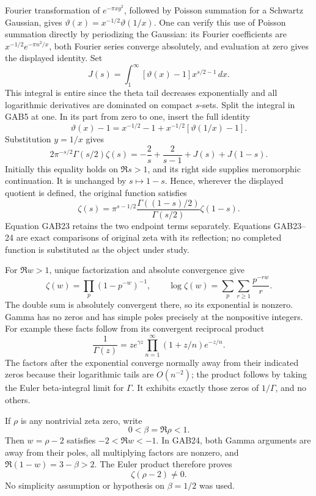\documentclass[
  10pt,
  a4paper,
]{article}
\begin{document}
Fourier transformation of \(e^{-\pi x y^2}\), followed by Poisson
summation for a Schwartz Gaussian, gives
\(\vartheta(x)=x^{-1/2}\vartheta(1/x)\). One can verify this use of
Poisson summation directly by periodizing the Gaussian: its Fourier
coefficients are \(x^{-1/2}e^{-\pi n^2/x}\), both Fourier series
converge absolutely, and evaluation at zero gives the displayed
identity. Set \[
 J(s)=\int_1^\infty[\vartheta(x)-1]x^{s/2-1}\,dx.
\] This integral is entire since the theta tail decreases exponentially
and all logarithmic derivatives are dominated on compact \(s\)-sets.
Split the integral in GAB5 at one. In its part from zero to one, insert
the full identity \[
 \vartheta(x)-1=x^{-1/2}-1
                    +x^{-1/2}[\vartheta(1/x)-1].
\] Substitution \(y=1/x\) gives \[
 2\pi^{-s/2}\Gamma(s/2)\zeta(s)
 =-\frac2s+\frac2{s-1}+J(s)+J(1-s).                    \tag{GAB23}
\] Initially this equality holds on \(\Re s>1\), and its right side
supplies meromorphic continuation. It is unchanged by \(s\mapsto1-s\).
Hence, wherever the displayed quotient is defined, the original function
satisfies \[
 \boxed{\displaystyle
 \zeta(s)=
 \pi^{s-1/2}
 \frac{\Gamma((1-s)/2)}{\Gamma(s/2)}
 \zeta(1-s).}                                         \tag{GAB24}
\] Equation GAB23 retains the two endpoint terms separately. Equations
GAB23--24 are exact comparisons of original zeta with its reflection; no
completed function is substituted as the object under study.

For \(\Re w>1\), unique factorization and absolute convergence give \[
 \zeta(w)=\prod_{p}(1-p^{-w})^{-1},\qquad
 \log\zeta(w)=\sum_{p}\sum_{r\ge1}\frac{p^{-rw}}r.
\] The double sum is absolutely convergent there, so its exponential is
nonzero. Gamma has no zeros and has simple poles precisely at the
nonpositive integers. For example these facts follow from its convergent
reciprocal product \[
 \frac1{\Gamma(z)}
   =z e^{\gamma z}\prod_{n=1}^{\infty}
           (1+z/n)e^{-z/n}.
\] The factors after the exponential converge normally away from their
indicated zeros because their logarithmic tails are \(O(n^{-2})\); the
product follows by taking the Euler beta-integral limit for \(\Gamma\).
It exhibits exactly those zeros of \(1/\Gamma\), and no others.

If \(\rho\) is any nontrivial zeta zero, write \[
 0<\beta=\Re\rho<1.
\] Then \(w=\rho-2\) satisfies \(-2<\Re w<-1\). In GAB24, both Gamma
arguments are away from their poles, all multiplying factors are
nonzero, and \(\Re(1-w)=3-\beta>2\). The Euler product therefore proves
\[
 \boxed{\zeta(\rho-2)\ne0.}                            \tag{GAB25}
\] No simplicity assumption or hypothesis on \(\beta=1/2\) was used.
\end{document}

